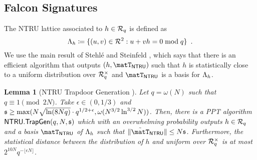 \documentclass[11pt,letterpaper]{article}
\newcounter{theo}[section]
\newtheorem{lemma}[theorem]{Lemma}
\theoremstyle{definition} %
\begin{document}
\subsection{Falcon Signatures}\label{sec:ntru-lattices}
The NTRU lattice associated to $h \in \mathcal{R}_q$ is defined as
			\begin{equation*}
				\Lambda_{h} \coloneqq  \{(u,v) \in \mathcal{R}^2 : u + vh = 0 \bmod q \}
				\enspace.
			\end{equation*}
			We use the main result of Stehlé  and Steinfeld \cite{DBLP:journals/iacr/StehleS13}, which says that there is an efficient algorithm that outputs $(h,\NTRUbasis)$ such that $h$ is statistically close to a uniform distribution over $\mathcal{R}_q^\times$ and $\NTRUbasis$ is a basis for $\Lambda_{h}$. 
			\begin{lemma}[NTRU Trapdoor Generation \cite{DBLP:journals/iacr/StehleS13}]\label{lemma:NTRUTrapGen}
                Let $q = \omega(N)$ such that $q \equiv 1 \pmod{2N}$. Take $\epsilon \in (0,1/3)$ and $\mathfrak{s} \geq \max(N\sqrt{\ln(8Nq)}\cdot q^{1/2 + \epsilon}, \omega(N^{3/2}\ln^{3/2}N))$. Then, there is a PPT algorithm $\mathsf{NTRU.TrapGen}(q,N,\mathfrak{s})$ which with an overwhelming probability outputs $h \in \mathcal{R}_q$ and a basis $\NTRUbasis$ of $\Lambda_{h}$ such that $\|\tilde{\matT}_\ntru\| \leq  N\stdev$. Furthermore, the statistical distance between the distribution of $h$ and uniform over $\mathcal{R}_q^\times$ is at most $2^{10N}q^{-\lfloor \epsilon N \rfloor}$.
			\end{lemma}
\end{document}
